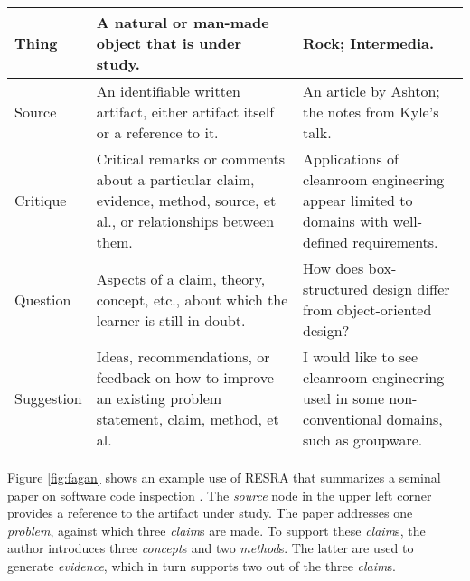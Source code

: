 \begin{figure*}[htb]
\begin{center}
\begin{tabular} {|l|p{2.5in}|p{2.5in}|}
      Thing & A natural or man-made object that is under study.  &
      Rock; Intermedia.  \\ \hline
      
      Source & An identifiable written artifact, either artifact
      itself or a reference to it. & An
      article by Ashton; the notes from Kyle's talk. \\ \hline \hline
      
      Critique & Critical remarks or comments about a particular
      claim, evidence, method, source, et al., or relationships
      between them. & Applications of cleanroom
      engineering appear limited to domains with well-defined requirements.
      \\ \hline
      
      Question & Aspects of a claim, theory, concept, etc., about
      which the learner is still in doubt. & How does box-structured
      design differ from object-oriented design? \\ \hline
      
      Suggestion & Ideas, recommendations, or feedback on how to
      improve an existing problem statement, claim, method, et al.  &
      I would like to see cleanroom engineering used in some
      non-conventional domains, such as groupware. \\ \hline
    \end{tabular}
    \label{tab:resra}
      \end{center}
\end{figure*}

\begin{figure*}[htb]
 \centerline{}
  \label{fig:sum-resra}
\end{figure*}

Figure \ref{fig:fagan} shows an example use of RESRA that summarizes a
seminal paper on software code inspection \cite{Fagan76}.  The {\em source}
node in the upper left corner provides a reference to the artifact under
study. The paper addresses one {\em problem}, against which three {\em
claim}s are made. To support these {\em claim}s, the author introduces
three {\em concept}s and two {\em method}s. The latter are used to generate
{\em evidence}, which in turn supports two out of the three {\em claim}s.

